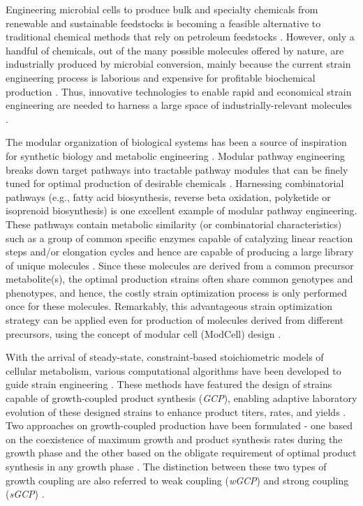 Engineering microbial cells to produce bulk and specialty chemicals from renewable and sustainable feedstocks is becoming a feasible alternative to traditional chemical methods that rely on petroleum feedstocks \citep{nielsen2016}.
However, only a handful of chemicals, out of the many possible molecules offered by nature, are industrially produced by microbial conversion, mainly because the current strain engineering process is laborious and expensive for profitable biochemical production \citep{trinh2016}.
Thus, innovative technologies to enable rapid and economical strain engineering are needed to harness a large space of industrially-relevant molecules \citep{connelly2015}.

The modular organization of biological systems has been a source of inspiration for synthetic biology and metabolic engineering \citep{purnick2009, sauro2008}.
Modular pathway engineering breaks down target pathways into tractable pathway modules that can be finely tuned for optimal production of desirable chemicals \citep{biggs2014, yadav2012}.
Harnessing combinatorial pathways (e.g., fatty acid biosynthesis, reverse beta oxidation, polyketide or isoprenoid biosynthesis) is one excellent example of modular pathway engineering.
These pathways contain metabolic similarity (or combinatorial characteristics) such as a group of common specific enzymes capable of catalyzing linear reaction steps \citep{rodriguez2014} and/or elongation cycles \citep{cheong2016, tseng2012b, xu2013} and hence are capable of producing a large library of unique molecules \citep{ng2016}.
Since these molecules are derived from a common precursor metabolite(s), the optimal production strains often share common genotypes and phenotypes, and hence, the costly strain optimization process is only performed once for these molecules.
Remarkably, this advantageous strain optimization strategy can be applied even for production of molecules derived from different precursors, using the concept of modular cell (ModCell) design \citep{trinh2015, trinh2016, wilbanks2017}.

With the arrival of steady-state, constraint-based stoichiometric models of cellular metabolism, various computational algorithms have been developed to guide strain engineering \citep{chowdhury2015, long2015, yang2011}.
These methods have featured the design of strains capable of growth-coupled product synthesis (\emph{GCP}), enabling adaptive laboratory evolution of these designed strains to enhance product titers, rates, and yields \citep{fong2005b, yadav2012, trinh2009, wilbanks2017}.
Two approaches on growth-coupled production have been formulated - one based on the coexistence of maximum growth and product synthesis rates during the growth phase \citep{burgard2003} and the other based on the obligate requirement of optimal product synthesis in any growth phase \citep{trinh2008}.
The distinction between these two types of growth coupling are also referred to weak coupling (\emph{wGCP}) and strong coupling (\emph{sGCP}) \citep{klamt2015, yang2011}.

